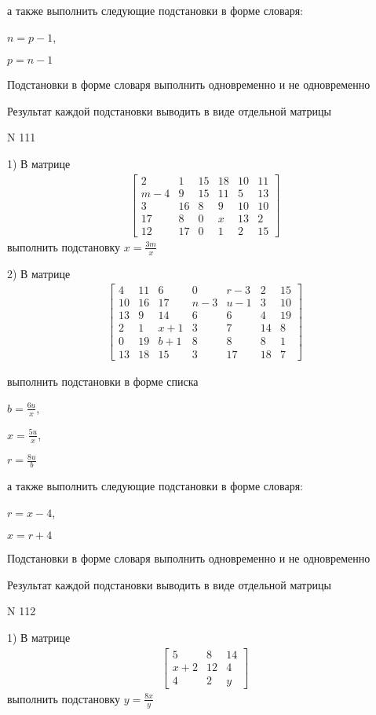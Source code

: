 \documentclass[11pt]{report}
\begin{document}
а также выполнить следующие подстановки в форме словаря:

$n=p - 1$,

$p=n - 1$


    Подстановки в форме словаря выполнить одновременно и не одновременно


    Результат каждой подстановки выводить в виде отдельной матрицы

\newpage
N 111


    1) В матрице
\begin{align*}
\left[\begin{matrix}2 & 1 & 15 & 18 & 10 & 11\\m - 4 & 9 & 15 & 11 & 5 & 13\\3 & 16 & 8 & 9 & 10 & 10\\17 & 8 & 0 & x & 13 & 2\\12 & 17 & 0 & 1 & 2 & 15\end{matrix}\right]
\end{align*}
выполнить подстановку $x=\frac{3 m}{x}$


    2) В матрице
\begin{align*}
\left[\begin{matrix}4 & 11 & 6 & 0 & r - 3 & 2 & 15\\10 & 16 & 17 & n - 3 & u - 1 & 3 & 10\\13 & 9 & 14 & 6 & 6 & 4 & 19\\2 & 1 & x + 1 & 3 & 7 & 14 & 8\\0 & 19 & b + 1 & 8 & 8 & 8 & 1\\13 & 18 & 15 & 3 & 17 & 18 & 7\end{matrix}\right]
\end{align*}

выполнить подстановки в форме списка

$b=\frac{6 u}{x}$,

$x=\frac{5 u}{x}$,

$r=\frac{8 u}{b}$

а также выполнить следующие подстановки в форме словаря:

$r=x - 4$,

$x=r + 4$


    Подстановки в форме словаря выполнить одновременно и не одновременно


    Результат каждой подстановки выводить в виде отдельной матрицы

\newpage
N 112


    1) В матрице
\begin{align*}
\left[\begin{matrix}5 & 8 & 14\\x + 2 & 12 & 4\\4 & 2 & y\end{matrix}\right]
\end{align*}
выполнить подстановку $y=\frac{8 x}{y}$
\end{document}
